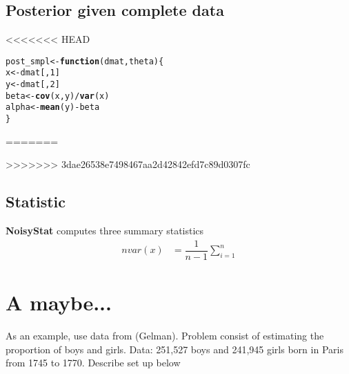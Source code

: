 \documentclass{article}\usepackage[]{graphicx}\usepackage[]{xcolor}
\makeatletter
\newcommand{\hlnum}[1]{\textcolor[rgb]{0.686,0.059,0.569}{#1}}%
\newcommand{\hlopt}[1]{\textcolor[rgb]{0,0,0}{#1}}%
\newcommand{\hlstd}[1]{\textcolor[rgb]{0.345,0.345,0.345}{#1}}%
\newcommand{\hlkwa}[1]{\textcolor[rgb]{0.161,0.373,0.58}{\textbf{#1}}}%
\newcommand{\hlkwb}[1]{\textcolor[rgb]{0.69,0.353,0.396}{#1}}%
\newcommand{\hlkwc}[1]{\textcolor[rgb]{0.333,0.667,0.333}{#1}}%
\newcommand{\hlkwd}[1]{\textcolor[rgb]{0.737,0.353,0.396}{\textbf{#1}}}%
\newenvironment{kframe}{%
 \def\at@end@of@kframe{}%
 \ifinner\ifhmode%
  \def\at@end@of@kframe{\end{minipage}}%
  \begin{minipage}{\columnwidth}%
 \fi\fi%
 \def\FrameCommand##1{\hskip\@totalleftmargin \hskip-\fboxsep
 \colorbox{shadecolor}{##1}\hskip-\fboxsep
     \hskip-\linewidth \hskip-\@totalleftmargin \hskip\columnwidth}%
 \MakeFramed {\advance\hsize-\width
   \@totalleftmargin\z@ \linewidth\hsize
   \@setminipage}}%
 {\par\unskip\endMakeFramed%
 \at@end@of@kframe}
\newenvironment{knitrout}{}{} %
\theoremstyle{definition}
\makeatother
\begin{document}
\subsection*{Posterior given complete data}
<<<<<<< HEAD
\begin{knitrout}
\color{fgcolor}\begin{kframe}
\begin{alltt}
\hlstd{post_smpl} \hlkwb{<-} \hlkwa{function}\hlstd{(}\hlkwc{dmat}\hlstd{,} \hlkwc{theta}\hlstd{) \{}
  \hlstd{x} \hlkwb{<-} \hlstd{dmat[,}\hlnum{1}\hlstd{]}
  \hlstd{y} \hlkwb{<-} \hlstd{dmat[,}\hlnum{2}\hlstd{]}
  \hlstd{beta} \hlkwb{<-}\hlkwd{cov}\hlstd{(x,y)}\hlopt{/}\hlkwd{var}\hlstd{(x)}
  \hlstd{alpha} \hlkwb{<-} \hlkwd{mean}\hlstd{(y)} \hlopt{-} \hlstd{beta}
\hlstd{\}}
\end{alltt}
\end{kframe}
\end{knitrout}
=======

>>>>>>> 3dae26538e7498467aa2d42842efd7c89d0307fc

\subsection*{Statistic}
\textbf{NoisyStat} computes three summary statistics
\begin{align*}
nvar(x) &= \dfrac{1}{n-1}\sum_{i=1}^{n}
\end{align*}


\newpage

\section*{A maybe...}


As an example, use data from (Gelman). Problem
consist of estimating the proportion of boys and girls.
Data: 251,527 boys and 241,945 girls born in Paris
from 1745 to 1770. Describe set up below
\end{document}
